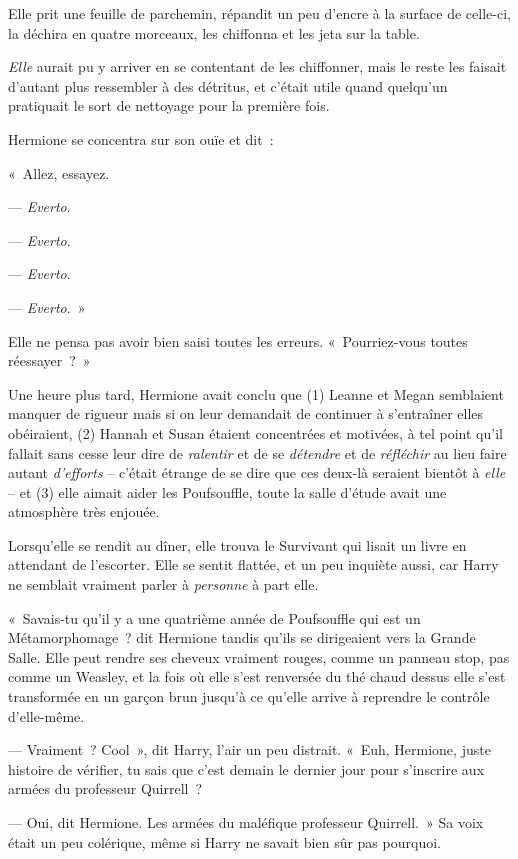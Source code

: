 Elle prit une feuille de parchemin, répandit un peu d'encre à la surface de celle-ci, la déchira en quatre morceaux, les chiffonna et les jeta sur la table.

\emph{Elle} aurait pu y arriver en se contentant de les chiffonner, mais le reste les faisait d'autant plus ressembler à des détritus, et c'était utile quand quelqu'un pratiquait le sort de nettoyage pour la première fois.

Hermione se concentra sur son ouïe et dit~:

«~Allez, essayez.

--- \emph{Everto}.

--- \emph{Everto}.

--- \emph{Everto}.

--- \emph{Everto}.~»

Elle ne pensa pas avoir bien saisi toutes les erreurs. «~Pourriez-vous toutes réessayer~?~»

Une heure plus tard, Hermione avait conclu que (1) Leanne et Megan semblaient manquer de rigueur mais si on leur demandait de continuer à s'entraîner elles obéiraient, (2) Hannah et Susan étaient concentrées et motivées, à tel point qu'il fallait sans cesse leur dire de \emph{ralentir} et de se \emph{détendre} et de \emph{réfléchir} au lieu faire autant \emph{d'efforts} -- c'était étrange de se dire que ces deux-là seraient bientôt à \emph{elle} -- et (3) elle aimait aider les Poufsouffle, toute la salle d'étude avait une atmosphère très enjouée.

Lorsqu'elle se rendit au dîner, elle trouva le Survivant qui lisait un livre en attendant de l'escorter. Elle se sentit flattée, et un peu inquiète aussi, car Harry ne semblait vraiment parler à \emph{personne} à part elle.

«~Savais-tu qu'il y a une quatrième année de Poufsouffle qui est un Métamorphomage~? dit Hermione tandis qu'ils se dirigeaient vers la Grande Salle. Elle peut rendre ses cheveux vraiment rouges, comme un panneau stop, pas comme un Weasley, et la fois où elle s'est renversée du thé chaud dessus elle s'est transformée en un garçon brun jusqu'à ce qu'elle arrive à reprendre le contrôle d'elle-même.

--- Vraiment~? Cool~», dit Harry, l'air un peu distrait. «~Euh, Hermione, juste histoire de vérifier, tu sais que c'est demain le dernier jour pour s'inscrire aux armées du professeur Quirrell~?

--- Oui, dit Hermione. Les armées du maléfique professeur Quirrell.~» Sa voix était un peu colérique, même si Harry ne savait bien sûr pas pourquoi.

